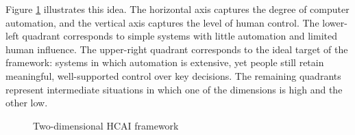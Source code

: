 \documentclass[twoside,final]{Contexto}
\begin{document}
Figure \ref{fig:HCAI_dimensions} illustrates this idea. The horizontal axis captures the degree of computer automation, and the vertical axis captures the level of human control. The lower-left quadrant corresponds to simple systems with little automation and limited human influence. The upper-right quadrant corresponds to the ideal target of the framework: systems in which automation is extensive, yet people still retain meaningful, well-supported control over key decisions. The remaining quadrants represent intermediate situations in which one of the dimensions is high and the other low.

\begin{figure}[H]
\centering
{}
\caption{Two-dimensional HCAI framework}
\label{fig:HCAI_dimensions}
\end{figure}
\end{document}
